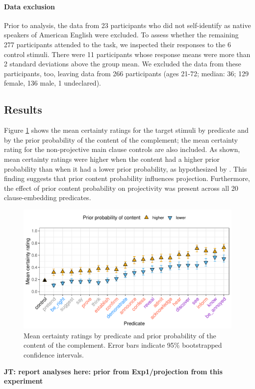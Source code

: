 \documentclass[11pt,fleqn]{article}
\newcommand{\6}{\mbox{$[\hspace*{-.6mm}[$}}
\newcommand{\9}{\mbox{$]\hspace*{-.6mm}]$}}
\newcommand{\jt}[1]{\textbf{\color{blue}JT: #1}}
\begin{document}
\paragraph{Data exclusion}
Prior to analysis, the data from 23 participants who did not self-identify as native speakers of American English were excluded. To assess whether the remaining 277 participants attended to the task, we inspected their responses to the 6 control stimuli. There were 11 participants whose response means were more than 2 standard deviations above the group mean. We excluded the data from these participants, too, leaving data from 266 participants (ages 21-72; median: 36; 129 female, 136 male, 1 undeclared).

\subsection{Results}

Figure \ref{f-projection2} shows the mean certainty ratings for the target stimuli by predicate and by the prior probability of the content of the complement; the mean certainty rating for the non-projective main clause controls are also included. As shown, mean certainty ratings were higher when the content had a higher prior probability than when it had a lower prior probability, as hypothesized by \citet{tbd-variability}. This finding suggests that prior content probability influences projection. Furthermore, the effect of prior content probability on projectivity was present across all 20 clause-embedding predicates.

\begin{figure}[H]
\centering

\includegraphics[width=.75\paperwidth]{../../results/3-projectivity/graphs/means-projectivity-by-predicate-and-facttype}

\caption{Mean certainty ratings by predicate and prior probability of the content of the complement. Error bars indicate 95\% bootstrapped confidence intervals.} 
\label{f-projection2}
\end{figure}

\jt{report analyses here: prior from Exp1/projection from this experiment}



\end{document}

